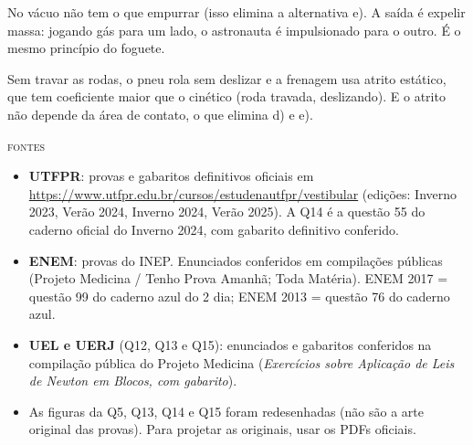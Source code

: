 \documentclass[11pt,a4paper]{article}
\begin{document}
\begin{description}[style=nextline, leftmargin=0pt]
\item[Q10 --- C (3\textordfeminine{} Lei / conserva\c{c}\~ao do momento).]
No v\'acuo n\~ao tem o que empurrar (isso elimina a alternativa e). A
sa\'ida \'e expelir massa: jogando g\'as para um lado, o astronauta \'e
impulsionado para o outro. \'E o mesmo princ\'ipio do foguete.

\item[Q11 --- B (atrito est\'atico $\times$ cin\'etico).]
Sem travar as rodas, o pneu rola sem deslizar e a frenagem usa atrito
est\'atico, que tem coeficiente maior que o cin\'etico (roda travada,
deslizando). E o atrito n\~ao depende da \'area de contato, o que
elimina d) e e).

\end{description}

\bigskip

\begin{painel}
{\small\scshape\color{grafite}fontes}\par\smallskip
\small
\begin{itemize}[nosep, leftmargin=1.5em]
  \item \textbf{UTFPR}: provas e gabaritos definitivos oficiais em
        \url{https://www.utfpr.edu.br/cursos/estudenautfpr/vestibular}
        (edi\c{c}\~oes: Inverno 2023, Ver\~ao 2024, Inverno 2024,
        Ver\~ao 2025). A Q14 \'e a quest\~ao 55 do
        caderno oficial do Inverno 2024, com gabarito definitivo
        conferido.
  \item \textbf{ENEM}: provas do INEP. Enunciados conferidos em
        compila\c{c}\~oes p\'ublicas (Projeto Medicina / Tenho Prova
        Amanh\~a; Toda Mat\'eria). ENEM 2017 = quest\~ao 99 do caderno
        azul do 2\textordfeminine{} dia; ENEM 2013 = quest\~ao 76 do
        caderno azul.
  \item \textbf{UEL e UERJ} (Q12, Q13 e Q15): enunciados e gabaritos
        conferidos na compila\c{c}\~ao p\'ublica do Projeto Medicina
        (\textit{Exerc\'icios sobre Aplica\c{c}\~ao de Leis de Newton
        em Blocos, com gabarito}).
  \item As figuras da Q5, Q13, Q14 e Q15 foram redesenhadas (n\~ao
        s\~ao a arte original das provas). Para projetar as originais,
        usar os PDFs oficiais.
\end{itemize}
\end{painel}

\newcommand{\tituloanexo}{%
  \thispagestyle{empty}%
  {\Large\bfseries Resolu\c{c}\~oes Passo a Passo}\\[-0.55em]
  {\color{black!30}\rule{\linewidth}{0.5pt}}\\[0.35em]
  {\small\itshape\color{grafite}Manuscritas, das quest\~oes de
  c\'alculo (Q4, Q7 e Q12 a Q17).}%
}




\end{document}
